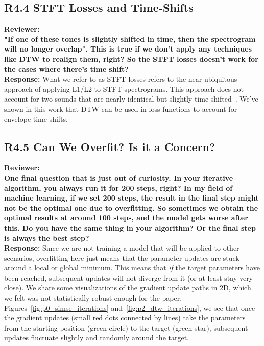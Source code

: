 \documentclass[11pt]{article}
\begin{document}
\subsection{\textbf{R4.4} STFT Losses and Time-Shifts}
\noindent\textbf{Reviewer:}\\
\textbf{"If one of these tones is slightly shifted in time, then the spectrogram will no longer overlap". This is true if we don't apply any techniques like DTW to realign them, right?
So the STFT losses doesn't work for the cases where there's time shift?}
\\

\noindent\textbf{Response:}
What we refer to as STFT losses refers to the near ubiquitous approach of applying L1/L2 to STFT spectrograms. This approach does not account for two sounds that are nearly identical but slightly time-shifted~\cite{vahidi2023mesostructures,turian2020sorry}. We've shown in this work that DTW can be used in loss functions to account for envelope time-shifts.

\subsection{\textbf{R4.5} Can We Overfit? Is it a Concern?}
\label{R4.5}
\noindent\textbf{Reviewer:}\\
\textbf{One final question that is just out of curiosity.
In your iterative algorithm, you always run it for 200 steps, right?
In my field of machine learning, if we set 200 steps, the result in the final step might not be the optimal one due to overfitting. So sometimes we obtain the optimal results at around 100 steps, and the model gets worse after this.
Do you have the same thing in your algorithm? Or the final step is always the best step?
}
\\

\noindent\textbf{Response:} 
Since we are not training a model that will be applied to other scenarios, overfitting here just means that the parameter updates are stuck around a local or global minimum. This means that \textit{if} the target parameters have been reached, subsequent updates will not diverge from it (or at least stay very close). We share some visualizations of the gradient update paths in 2D, which we felt was not statistically robust enough for the paper. Figures~\ref{fig:p0_simse_iterations} and~\ref{fig:p2_dtw_iterations}, we see that once the gradient updates (small red dots connected by lines) take the parameters from the starting position (green circle) to the target (green star), subsequent updates fluctuate slightly and randomly around the target. 
\end{document}
